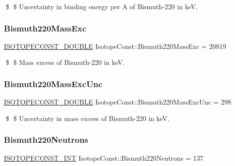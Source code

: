 \$ \$ Uncertainty in binding energy per A of Bismuth-\/220 in keV. \mbox{\label{group___isotope_const-_bismuth-_bi220_ga41389752bfafb94b7ef9f1679fd94555}} 
\subsubsection{\texorpdfstring{Bismuth220\+Mass\+Exc}{Bismuth220MassExc}}
{\footnotesize\ttfamily \mbox{\hyperlink{group___isotope_const-_macros_ga8f45a7272ce02c0b4c65c44636ed719a}{I\+S\+O\+T\+O\+P\+E\+C\+O\+N\+S\+T\+\_\+\+D\+O\+U\+B\+LE}} Isotope\+Const\+::\+Bismuth220\+Mass\+Exc = 20819}

\$ \$ Mass excess of Bismuth-\/220 in keV. \mbox{\label{group___isotope_const-_bismuth-_bi220_ga321a1291790df5aa1faf29530b1583fc}} 
\subsubsection{\texorpdfstring{Bismuth220\+Mass\+Exc\+Unc}{Bismuth220MassExcUnc}}
{\footnotesize\ttfamily \mbox{\hyperlink{group___isotope_const-_macros_ga8f45a7272ce02c0b4c65c44636ed719a}{I\+S\+O\+T\+O\+P\+E\+C\+O\+N\+S\+T\+\_\+\+D\+O\+U\+B\+LE}} Isotope\+Const\+::\+Bismuth220\+Mass\+Exc\+Unc = 298}

\$ \$ Uncertainty in mass excess of Bismuth-\/220 in keV. \mbox{\label{group___isotope_const-_bismuth-_bi220_ga147fcbf0afda8f462b3c6b02803d02a2}} 
\subsubsection{\texorpdfstring{Bismuth220\+Neutrons}{Bismuth220Neutrons}}
{\footnotesize\ttfamily \mbox{\hyperlink{group___isotope_const-_macros_ga5f18360b3e99483a35c32d789e62621c}{I\+S\+O\+T\+O\+P\+E\+C\+O\+N\+S\+T\+\_\+\+I\+NT}} Isotope\+Const\+::\+Bismuth220\+Neutrons = 137}

